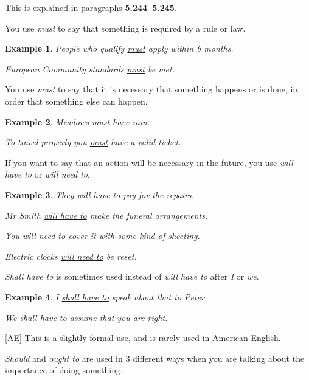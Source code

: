 \documentclass[oneside]{book}
\numberwithin{equation}{section}
\newtheorem{example}{Example}[section]
\begin{document}
This is explained in paragraphs \textbf{5.244--5.245}.

%
You use \textit{must} to say that something is required by a rule or law.
\begin{example}
    People who qualify \underline{must} apply within 6 months.
    
    European Community standards \underline{must} be met.
\end{example}
You use \textit{must} to say that it is necessary that something happens or is done, in order that something else can happen.
\begin{example}
    Meadows \underline{must} have rain.
    
    To travel properly you \underline{must} have a valid ticket.
\end{example}
%
\noindent{} If you want to say that an action will be necessary in the future, you use \textit{will have to} or \textit{will need to}.
\begin{example}
    They \underline{will have to} pay for the repairs.
    
    Mr Smith \underline{will have to} make the funeral arrangements.
    
    You \underline{will need to} cover it with some kind of sheeting.
    
    Electric clocks \underline{will need to} be reset.
\end{example}
%
\noindent{} \textit{Shall have to} is sometimes used instead of \textit{will have to} after \textit{I} or \textit{we}.
\begin{example}
    I \underline{shall have to} speak about that to Peter.
    
    We \underline{shall have to} assume that you are right.
\end{example}
[AE] This is a slightly formal use, and is rarely used in American English.

%
\noindent{} \textit{Should} and \textit{ought to} are used in 3 different ways when you are talking about the importance of doing something.
\end{document}
